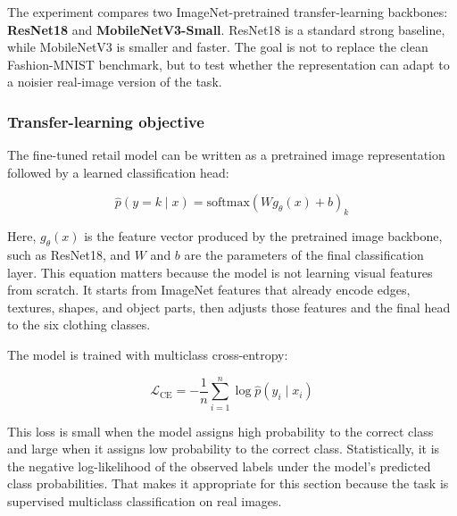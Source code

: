 \documentclass[11pt]{article}
\begin{document}
The experiment compares two ImageNet-pretrained transfer-learning
backbones: \textbf{ResNet18} and \textbf{MobileNetV3-Small}. ResNet18 is
a standard strong baseline, while MobileNetV3 is smaller and faster. The
goal is not to replace the clean Fashion-MNIST benchmark, but to test
whether the representation can adapt to a noisier real-image version of
the task.

\subsubsection{Transfer-learning
objective}\label{transfer-learning-objective}

The fine-tuned retail model can be written as a pretrained image
representation followed by a learned classification head:

\[
\hat{p}(y=k \mid x) = \mathrm{softmax}(W g_\theta(x) + b)_k
\]

Here, \(g_\theta(x)\) is the feature vector produced by the pretrained
image backbone, such as ResNet18, and \(W\) and \(b\) are the parameters
of the final classification layer. This equation matters because the
model is not learning visual features from scratch. It starts from
ImageNet features that already encode edges, textures, shapes, and
object parts, then adjusts those features and the final head to the six
clothing classes.

The model is trained with multiclass cross-entropy:

\[
\mathcal{L}_{\text{CE}} = -\frac{1}{n} \sum_{i=1}^{n} \log \hat{p}(y_i \mid x_i)
\]

This loss is small when the model assigns high probability to the
correct class and large when it assigns low probability to the correct
class. Statistically, it is the negative log-likelihood of the observed
labels under the model's predicted class probabilities. That makes it
appropriate for this section because the task is supervised multiclass
classification on real images.
\end{document}
